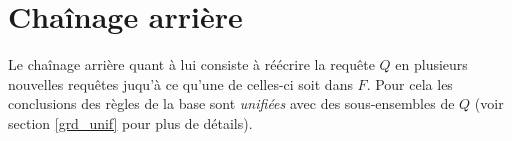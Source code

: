 
\section{Chaînage arrière}\label{def_backward}
Le chaînage arrière quant à lui consiste à réécrire la requête $Q$ en plusieurs nouvelles
requêtes juqu'à ce qu'une de celles-ci soit dans $F$.
Pour cela les conclusions des règles de la base sont {\em unifiées} avec 
des sous-ensembles de $Q$ (voir section \ref{grd_unif}
pour plus de détails).

